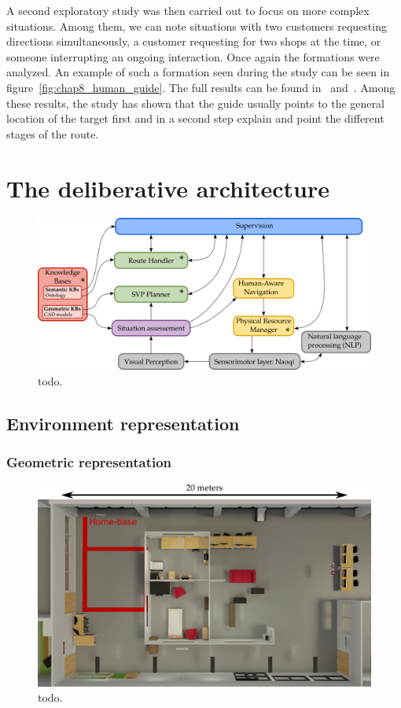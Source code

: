A second exploratory study was then carried out to focus on more complex situations. Among them, we can note situations with two customers requesting directions simultaneously, a customer requesting for two shops at the time, or someone interrupting an ongoing interaction. Once again the formations were analyzed. An example of such a formation seen during the study can be seen in figure~\ref{fig:chap8_human_guide}. The full results can be found in~\cite{Heikkilae_2018_where} and~\cite{heikkilae_2019_should}. Among these results, the study has shown that the guide usually points to the general location of the target first and in a second step explain and point the different stages of the route.

\section{The deliberative architecture}

\begin{figure}[ht!]
\centering
\includegraphics[width=\textwidth]{figures/chapter8/architecture.png}
\caption{\label{fig:chap8_architecture} todo. }
\end{figure}

\subsection{Environment representation}

\subsubsection{Geometric representation}

\begin{figure}[ht!]
\centering
\includegraphics[scale=0.15]{figures/chapter8/adream_base_m.png}
\caption{\label{fig:chap8_adream_base} todo. }
\end{figure}

